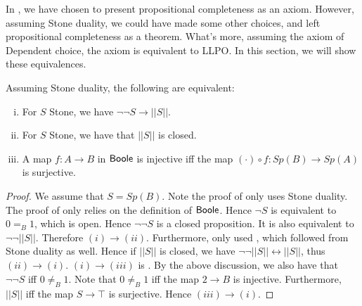 In , we have chosen to present propositional completeness as an axiom. 
However, assuming Stone duality, we could have made some other choices, 
and left propositional completeness as a theorem. 
What's more, assuming the axiom of Dependent choice,
the axiom is equivalent to LLPO. 
In this section, we will show these equivalences. 

\begin{theorem}\label{AlternativesToAxiom2}
  Assuming Stone duality, the following are equivalent:
  \begin{enumerate}[(i)]
    \item For $S$ Stone, we have $\neg \neg S \to ||S||$. 
    \item For $S$ Stone, we have that $||S||$ is closed. 
    \item A map $f:A \to B$ in $\mathsf{Boole}$ is injective iff the map $(\cdot) \circ f : Sp(B) \to Sp(A)$ is surjective. 
  \end{enumerate}
\end{theorem}
\begin{proof}
  We assume that $S= Sp(B)$. 
  Note the proof of  only uses Stone duality. 
  The proof of  only relies on the definition of $\mathsf{Boole}$.
  Hence $\neg S$ is equivalent to $0=_B 1$, which is open. 
  Hence $\neg \neg S$ is a closed proposition. It is also equivalent to $\neg \neg ||S||$. 
  Therefore $(i) \to (ii)$. 
  Furthermore, 
  only used , 
  which followed from Stone duality as well. 
  Hence if $||S||$ is closed, we have $\neg \neg ||S|| \leftrightarrow ||S||$, thus $(ii) \to (i)$. 
  $(i)\to (iii)$ is . 
  By the above discussion, we also have that $\neg \neg S$ iff $0\neq_B 1$. 
  Note that $0\neq_B 1$ iff the map $2\to B$ is injective. 
  Furthermore, $||S||$ iff the map $S \to \top $ is surjective. 
  Hence $(iii) \to (i)$. 
\end{proof} 

